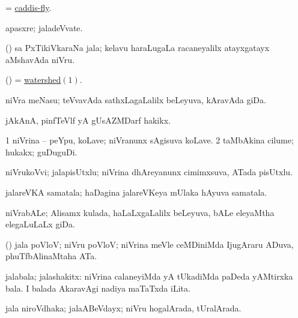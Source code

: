 \bentry
{} 
\gl{\nA}
\expl{}
\bmng
= \hyperref{kandict_c.pdf}{C}{caddis-fly}{caddis-fly}. 
\emng
\eentry

\bentry
{} 
\gl{\nA}
\expl{}
\bmng
apasxre; jaladeVvate. 
\emng
\eentry

\bentry
{} 
\gl{\nA}
\expl{}
\bmng
(\ravi) sa PxTikiVkaraNa jala; kelavu haraLugaLa racaneyalilx atayxgatayx aMshavAda niVru. 
\emng
\eentry

\bentry
{} 
\gl{\nA}
\expl{}
\bmng
(\ame) = \hyperlink{watershed}{watershed\((1)\)}. 
\emng
\eentry

\bentry
{} 
\gl{\nA}
\expl{}
\bmng
niVra meNasu; teVvavAda sathxLagaLalilx beLeyuva, kAravAda giDa. 
\emng
\eentry

\bentry
{} 
\gl{\nA}
\expl{}
\bmng
jAkAnA, pinfTeVlf yA gUsAZMDarf hakikx. 
\emng
\eentry

\bentry
{} 
\gl{\nA}
\expl{}
\bmng
\bnum
\num{1} niVrina -- peYpu, koLave; niVranunx sAgisuva koLave. 
\num{2} taMbAkina cilume; hukakx; guDuguDi. 
\enum
\emng
\eentry

\bentry
{} 
\gl{\nA}
\expl{}
\bmng
niVrukoVvi; jalapisUtxlu; niVrina dhAreyanunx cimimxsuva, ATada pisUtxlu. 
\emng
\eentry

\bentry
{} 
\gl{\nA}
\expl{}
\bmng
jalareVKA samatala; haDagina jalareVKeya mUlaka hAyuva samatala. 
\emng
\eentry

\bentry
{} 
\gl{\nA}
\expl{}
\bmng
niVrabALe; Alisamx kulada, haLaLxgaLalilx beLeyuva, bALe eleyaMtha elegaLuLaLx giDa. 
\emng
\eentry

\bentry
{} 
\gl{\nA}
\expl{}
\bmng
(\ravi) jala poVloV; niVru poVloV; niVrina meVle ceMDiniMda IjugAraru ADuva, phuTfbAlinaMtaha ATa. 
\emng
\eentry

\bentry
{} 
\gl{\nA}
\expl{}
\bmng
jalabala; jalashakitx: 
\banum
{} niVrina calaneyiMda yA tUkadiMda paDeda yAMtirxka bala. 
 I balada AkaravAgi nadiya maTaTxda iLita. 
\eanum
\emng
\eentry

\bentry
{} 
\gl{\gu}
\expl{}
\bmng
jala niroVdhaka; jalaABeVdayx; niVru hogalArada, tUralArada. 
\emng
\eentry

